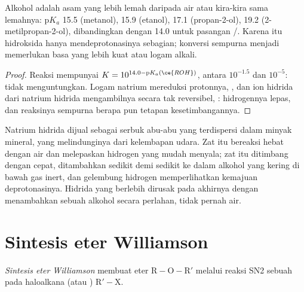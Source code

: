 \begin{proposition}\label{prop:b1:alcohol-activation:alcohol-acidity}
Alkohol adalah asam yang lebih lemah daripada air atau kira-kira sama
lemahnya: $\mathrm{p}K_a$ 15.5 (metanol), 15.9 (etanol), 17.1
(propan-2-ol), 19.2 (2-metilpropan-2-ol), dibandingkan dengan 14.0 untuk
pasangan /. Karena itu hidroksida hanya mendeprotonasinya
sebagian; konversi sempurna menjadi  memerlukan basa yang lebih
kuat atau logam alkali.
\end{proposition}

\begin{proof}
Reaksi  mempunyai $K = 10^{14.0 -
\mathrm{p}K_a(\ce{ROH})}$, antara $10^{-1.5}$ dan $10^{-5}$: tidak
menguntungkan. Logam natrium mereduksi protonnya,
, dan ion hidrida dari natrium hidrida
mengambilnya secara tak reversibel, : hidrogennya
lepas, dan reaksinya sempurna berapa pun tetapan kesetimbangannya.
\end{proof}

\begin{inthelab}
Natrium hidrida dijual sebagai serbuk abu-abu yang terdispersi dalam
minyak mineral, yang melindunginya dari kelembapan udara. Zat itu bereaksi
hebat dengan air dan melepaskan hidrogen yang mudah menyala; zat itu
ditimbang dengan cepat, ditambahkan sedikit demi sedikit ke dalam alkohol
yang kering di bawah gas inert, dan gelembung hidrogen memperlihatkan
kemajuan deprotonasinya. Hidrida yang berlebih dirusak pada akhirnya
dengan menambahkan sebuah alkohol secara perlahan, tidak pernah air.
\end{inthelab}

\section{Sintesis eter Williamson}

\begin{definition}\label{def:b1:alcohol-activation:williamson}
\emph{Sintesis eter Williamson}
membuat eter $\mathrm{R{-}O{-}R'}$ melalui reaksi SN2 sebuah  
pada haloalkana (atau ) $\mathrm{R'{-}X}$.
\end{definition}

